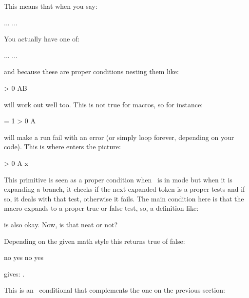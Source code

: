 This means that when you say:

\starttyping
\ifMytest ... \else ... \fi
\stoptyping

You actually have one of:

\starttyping
\iftrue  ... \else ... \fi
\iffalse ... \else ... \fi
\stoptyping

and because these are proper conditions nesting them like:

\starttyping
\ifnum\scratchcounter > 0 \ifMyTest A\else B\fi \fi
\stoptyping

will work out well too. This is not true for macros, so for instance:

\starttyping
\scratchcounter = 1
\unexpanded\def\ifMyTest{\iftrue}
\ifnum\scratchcounter > 0 \ifMyTest A\else B\fi \fi
\stoptyping

will make a run fail with an error (or simply loop forever, depending on your
code). This is where  enters the picture:

\starttyping
\def\MyTest{\iftrue} 
\ifnum\scratchcounter > 0
    \ifcondition\MyTest A\else B\fi
\else
    x
\fi
\stoptyping

This primitive is seen as a proper condition when \TEX\ is in  mode but when it is expanding a branch, it checks if
the next expanded token is a proper tests and if so, it deals with that test,
otherwise it fails. The main condition here is that the \type {\MyTest} macro
expands to a proper true or false test, so, a definition like:

\starttyping
\def\MyTest{\ifnum\scratchcounter<10 }
\stoptyping

is also okay. Now, is that neat or not?

\stopnewprimitive

\startnewprimitive[title={\prm {ifcramped}}]

Depending on the given math style this returns true of false:

\startbuffer
\ifcramped\mathstyle        no  \fi
\ifcramped\crampedtextstyle yes \fi
\ifcramped\textstyle        no  \fi
\ifcramped\displaystyle     yes \fi
\stopbuffer

\typebuffer

gives: \inlinebuffer.

\stopnewprimitive

\startoldprimitive[title={\prm {ifcsname}}]

This is an \ETEX\ conditional that complements the one on the previous section:

